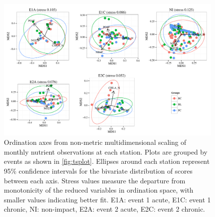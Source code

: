 \documentclass[letterpaper,12pt]{article}\usepackage[]{graphicx}\usepackage[]{color}
\begin{document}
\begin{landscape}
\begin{figure}
\centering\vspace*{\fill}
\includegraphics[width = 1.3\textwidth]{figs/ordres.pdf}
\caption{Ordination axes from non-metric multidimensional scaling of monthly nutrient observations at each station.  Plots are grouped by events as shown in \cref{fig:tsplot}.  Ellipses around each station represent 95\% confidence intervals for the bivariate distribution of scores between each axis. Stress values measure the departure from monotonicity of the reduced variables in ordination space, with smaller values indicating better fit.  E1A: event 1 acute, E1C: event 1 chronic, NI: non-impact, E2A: event 2 acute, E2C: event 2 chronic.}
\label{fig:ordplo}
\end{figure}
\end{landscape}
\clearpage
\end{document}
